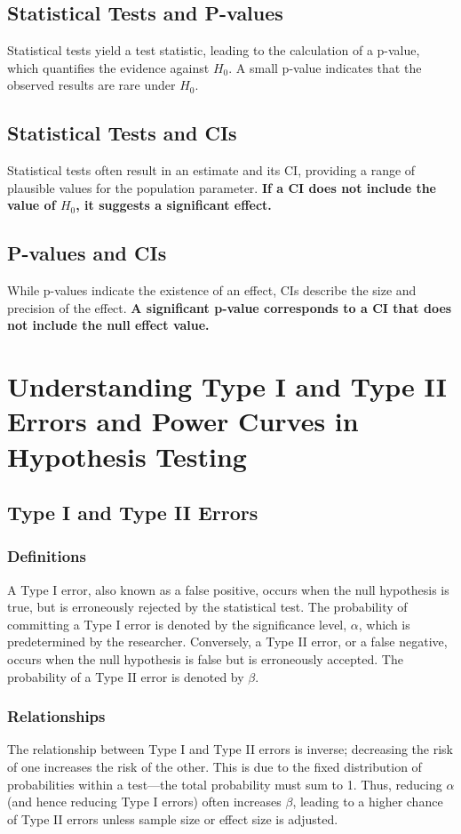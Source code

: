 \documentclass{article}
\begin{document}
\subsection{Statistical Tests and P-values}
Statistical tests yield a test statistic, leading to the calculation of a p-value, which quantifies the evidence against $H_0$. A small p-value indicates that the observed results are rare under $H_0$.

\subsection{Statistical Tests and CIs}
Statistical tests often result in an estimate and its CI, providing a range of plausible values for the population parameter. \textbf{If a CI does not include the value of $H_0$, it suggests a significant effect.}

\subsection{P-values and CIs}
While p-values indicate the existence of an effect, CIs describe the size and precision of the effect. \textbf{A significant p-value corresponds to a CI that does not include the null effect value.}

\section{Understanding Type I and Type II Errors and Power Curves in Hypothesis Testing}
\subsection{Type I and Type II Errors}
\subsubsection{Definitions}
A Type I error, also known as a false positive, occurs when the null hypothesis is true, but is erroneously rejected by the statistical test. The probability of committing a Type I error is denoted by the significance level, $\alpha$, which is predetermined by the researcher. Conversely, a Type II error, or a false negative, occurs when the null hypothesis is false but is erroneously accepted. The probability of a Type II error is denoted by $\beta$.
\subsubsection{Relationships}
The relationship between Type I and Type II errors is inverse; decreasing the risk of one increases the risk of the other. This is due to the fixed distribution of probabilities within a test—the total probability must sum to 1. Thus, reducing $\alpha$ (and hence reducing Type I errors) often increases $\beta$, leading to a higher chance of Type II errors unless sample size or effect size is adjusted.
\end{document}
